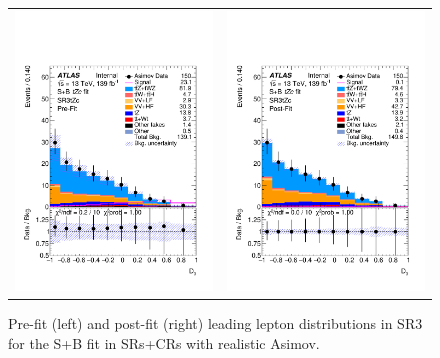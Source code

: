\begin{figure}[htbp]
	\centering
	\begin{tabular}{cc}
		\includegraphics[width=.45\textwidth]{Chapters/CH8/figures/SPLUSB_CRSR_UsingDL1rcFullSys/Plots/SR3} &
		\includegraphics[width=.45\textwidth]{Chapters/CH8/figures/SPLUSB_CRSR_UsingDL1rcFullSys/Plots/SR3_postFit} \\
	\end{tabular}
	\caption{Pre-fit (left) and post-fit (right) leading lepton \pt distributions in SR3 for the S+B \tZc fit in SRs+CRs with realistic Asimov.
		\ErrStatSys
	}%
	\label{fig:stat:tzc:splusb:crsr:srplots:2}
\end{figure}


